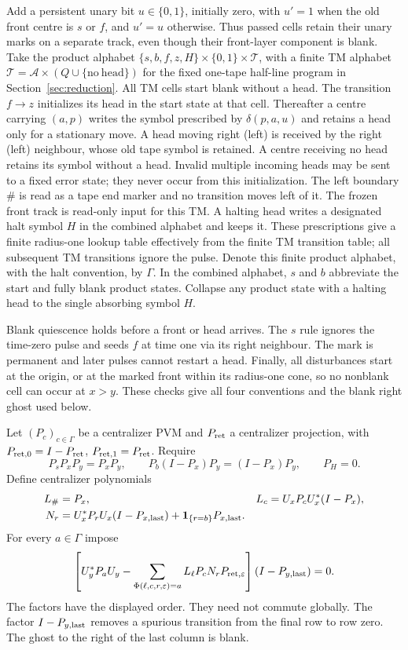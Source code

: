 Add a persistent unary bit $u\in\{0,1\}$, initially zero, with
$u'=1$ when the old front centre is $s$ or $f$, and $u'=u$ otherwise.
Thus passed cells retain their unary marks on a separate track, even
though their front-layer component is blank. Take the product alphabet
$\{s,b,f,z,H\}\times\{0,1\}\times\mathcal T$, with a finite TM alphabet
$\mathcal T=\mathcal A\times(Q\cup\{\mathrm{no\ head}\})$ for the fixed
one-tape half-line program in Section~\ref{sec:reduction}. All TM cells start
blank without a head. The transition $f\to z$ initializes its head in the
start state at that cell. Thereafter a centre carrying $(a,p)$ writes the
symbol prescribed by $\delta(p,a,u)$ and retains a head only for a stationary
move. A head moving right (left) is received by the right (left) neighbour,
whose old tape symbol is retained. A centre receiving no head retains its
symbol without a head. Invalid multiple incoming heads may be sent to a
fixed error state; they never occur from this initialization. The left
boundary $\#$ is read as a tape end marker and no transition moves left of
it. The frozen front track is read-only input for this TM. A halting head
writes a designated halt symbol $H$ in the combined alphabet and keeps it.
These prescriptions give a finite radius-one lookup table effectively
from the finite TM transition table; all subsequent TM transitions ignore
the pulse. Denote this finite product alphabet, with the halt convention,
by $\Gamma$. In the combined alphabet, $s$ and $b$ abbreviate the
start and fully blank product states. Collapse any product state with a
halting head to the single absorbing symbol $H$.

Blank quiescence holds before a front or head arrives. The $s$ rule ignores
the time-zero pulse and seeds $f$ at time one via its right neighbour.
The mark is permanent and later pulses cannot restart a head. Finally,
all disturbances start at the origin, or at the marked front within its
radius-one cone, so no nonblank cell can occur at $x>y$. These checks give
all four conventions and the blank right ghost used below.

Let $(P_c)_{c\in\Gamma}$ be a centralizer PVM and $P_{\rm ret}$ a centralizer projection, with $P_{{\rm ret},0}=I-P_{\rm ret}$, $P_{{\rm ret},1}=P_{\rm ret}$. Require
\begin{equation}\label{eq:initial}
 P_sP_xP_y=P_xP_y,\qquad P_b(I-P_x)P_y=(I-P_x)P_y,\qquad P_H=0.
\end{equation}
Define centralizer polynomials
\begin{align*}
 L_\#&=P_x,& L_c&=U_xP_cU_x^*(I-P_x),\\
 N_r&=U_x^*P_rU_x(I-P_{x,\rm last})+\mathbf1_{\{r=b\}}P_{x,\rm last}.
\end{align*}
For every $a\in\Gamma$ impose
\begin{equation}\label{eq:update}
 \left[U_y^*P_aU_y-\sum_{\Phi(\ell,c,r,\varepsilon)=a}
 L_\ell P_cN_rP_{{\rm ret},\varepsilon}\right](I-P_{y,\rm last})=0.
\end{equation}
The factors have the displayed order. They need not commute globally. The factor $I-P_{y,\rm last}$ removes a spurious transition from the final row to row zero. The ghost to the right of the last column is blank.

